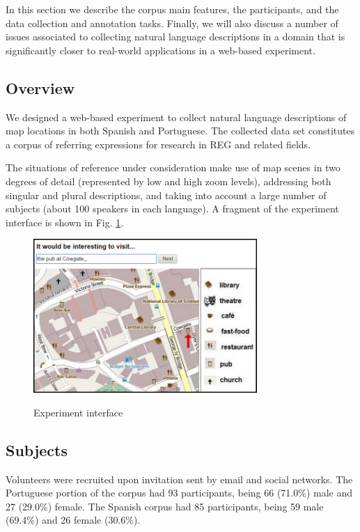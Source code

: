 \documentclass{article}
\begin{document}
In this section we describe the corpus main features, the participants, and the data collection and annotation tasks. Finally, we will also discuss a number of issues associated to collecting natural language descriptions in a domain that is significantly closer to real-world applications in a web-based experiment.   

\subsection{Overview}

We designed a web-based experiment to collect natural language descriptions of map locations in both Spanish and Portuguese. The collected data set constitutes a corpus of referring expressions for research in REG and related fields. 

The situations of reference under consideration make use of map scenes in two degrees of detail (represented by low and high zoom levels), addressing both singular and plural descriptions, and taking into account a large number of subjects (about 100 speakers in each language). A fragment of the experiment interface is shown in Fig. \ref{fig-interface}.

\begin{figure}[ht]
\begin{center}
\includegraphics[width=8.5cm]{figures/interface.png}\\[0pt]
\caption{Experiment interface}
\label{fig-interface}
\end{center}
\end{figure}


\subsection{Subjects}

Volunteers were recruited upon  invitation sent by email and social networks. The Portuguese portion of the corpus had 93 participants, being 66 (71.0\%) male and 27 (29.0\%) female. The Spanish corpus had 85 participants, being 59 male (69.4\%) and 26 female (30.6\%).
\end{document}
